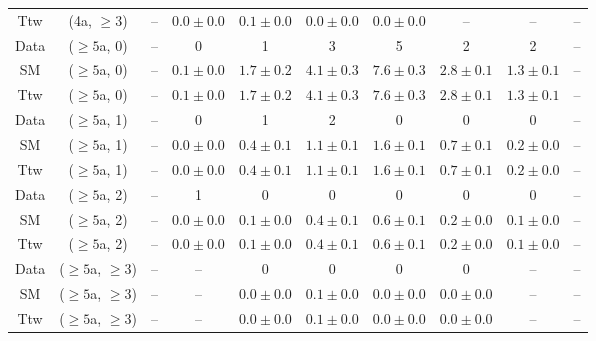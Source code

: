 \begin{table}[h!]
{\begin{tabular}{cccccccccc}
	Ttw & (4a, $\ge3$) & -- & $0.0\pm 0.0$ & $0.1\pm 0.0$ & $0.0\pm 0.0$ & $0.0\pm 0.0$ & -- & -- & -- \\[0.5ex] 
	Data & ($\ge5$a, 0) & -- & 0 & 1 & 3 & 5 & 2 & 2 & -- \\[0.5ex] 
	SM & ($\ge5$a, 0) & -- & $0.1\pm 0.0$ & $1.7\pm 0.2$ & $4.1\pm 0.3$ & $7.6\pm 0.3$ & $2.8\pm 0.1$ & $1.3\pm 0.1$ & -- \\[0.5ex] 
	Ttw & ($\ge5$a, 0) & -- & $0.1\pm 0.0$ & $1.7\pm 0.2$ & $4.1\pm 0.3$ & $7.6\pm 0.3$ & $2.8\pm 0.1$ & $1.3\pm 0.1$ & -- \\[0.5ex] 
	Data & ($\ge5$a, 1) & -- & 0 & 1 & 2 & 0 & 0 & 0 & -- \\[0.5ex] 
	SM & ($\ge5$a, 1) & -- & $0.0\pm 0.0$ & $0.4\pm 0.1$ & $1.1\pm 0.1$ & $1.6\pm 0.1$ & $0.7\pm 0.1$ & $0.2\pm 0.0$ & -- \\[0.5ex] 
	Ttw & ($\ge5$a, 1) & -- & $0.0\pm 0.0$ & $0.4\pm 0.1$ & $1.1\pm 0.1$ & $1.6\pm 0.1$ & $0.7\pm 0.1$ & $0.2\pm 0.0$ & -- \\[0.5ex] 
	Data & ($\ge5$a, 2) & -- & 1 & 0 & 0 & 0 & 0 & 0 & -- \\[0.5ex] 
	SM & ($\ge5$a, 2) & -- & $0.0\pm 0.0$ & $0.1\pm 0.0$ & $0.4\pm 0.1$ & $0.6\pm 0.1$ & $0.2\pm 0.0$ & $0.1\pm 0.0$ & -- \\[0.5ex] 
	Ttw & ($\ge5$a, 2) & -- & $0.0\pm 0.0$ & $0.1\pm 0.0$ & $0.4\pm 0.1$ & $0.6\pm 0.1$ & $0.2\pm 0.0$ & $0.1\pm 0.0$ & -- \\[0.5ex] 
	Data & ($\ge5$a, $\ge3$) & -- & -- & 0 & 0 & 0 & 0 & -- & -- \\[0.5ex] 
	SM & ($\ge5$a, $\ge3$) & -- & -- & $0.0\pm 0.0$ & $0.1\pm 0.0$ & $0.0\pm 0.0$ & $0.0\pm 0.0$ & -- & -- \\[0.5ex] 
	Ttw & ($\ge5$a, $\ge3$) & -- & -- & $0.0\pm 0.0$ & $0.1\pm 0.0$ & $0.0\pm 0.0$ & $0.0\pm 0.0$ & -- & -- \\[0.5ex] 
	\hline
	\hline
\end{tabular}}
\end{table}
